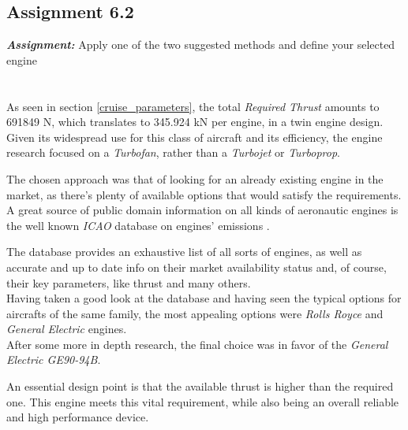 \documentclass{article}
\begin{document}
\clearpage


\subsection{Assignment 6.2\label{Assignment_6.2}}

\textbf{\textit{Assignment:}} Apply one of the two suggested methods and define your selected engine \\ \\ \\ 

As seen in section \ref{cruise_parameters}, the total \textit{Required Thrust} amounts to 691849 N, which
translates to 345.924 kN per engine, in a twin engine design.\\ 

Given its widespread use for this class of aircraft and its efficiency, the engine research focused on a 
\textit{Turbofan}, rather than a \textit{Turbojet} or \textit{Turboprop}. 

The chosen approach was that of looking for an already existing engine in the market, as there's plenty of available
options that would satisfy the requirements. \\ 

A great source of public domain information on all kinds of aeronautic engines is the well known \textit{ICAO}
database on engines' emissions \autocite{ICAO_engine_database}.

The database provides an exhaustive list of all sorts of engines, as well as accurate and up to date info on their market availability
status and, of course, their key parameters, like thrust and many others. \\ 

Having taken a good look at the database and having seen the typical options for aircrafts of the same family,
the most appealing options were \textit{Rolls Royce} and \textit{General Electric} engines. \\ 

After some more in depth research, the final choice was in favor of the \textit{General Electric GE90-94B}. 

An essential design point is that the available thrust is higher than the required one. 
This engine meets this vital requirement, while also being an overall reliable and high performance device. 


\clearpage
\end{document}
